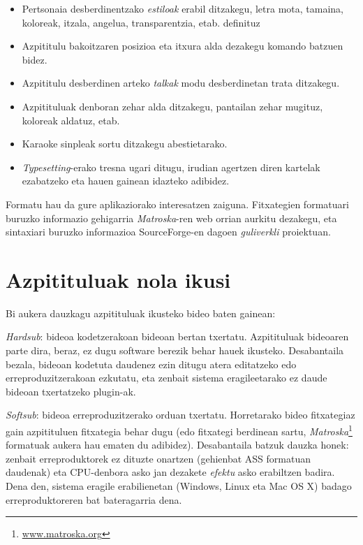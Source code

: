 \begin{itemize}
\item Pertsonaia desberdinentzako \textit{estiloak} erabil ditzakegu, letra mota, tamaina, koloreak, itzala, angelua, transparentzia, etab. definituz
\item Azpititulu bakoitzaren posizioa eta itxura alda dezakegu komando batzuen bidez.
\item Azpititulu desberdinen arteko \textit{talkak} modu desberdinetan trata ditzakegu.
\item Azpitituluak denboran zehar alda ditzakegu, pantailan zehar mugituz, koloreak aldatuz, etab.
\item Karaoke sinpleak sortu ditzakegu abestietarako.
\item \textit{Typesetting}-erako tresna ugari ditugu, irudian agertzen diren kartelak ezabatzeko eta hauen gainean idazteko adibidez.
\end{itemize}

Formatu hau da gure aplikaziorako interesatzen zaiguna. Fitxategien formatuari buruzko informazio gehigarria \textit{Matroska}-ren web orrian\cite{ma:ass} aurkitu dezakegu, eta sintaxiari buruzko informazioa SourceForge-en dagoen \textit{guliverkli} proiektuan\cite{gu:ass}.

\section{Azpitituluak nola ikusi}
Bi aukera dauzkagu azpitituluak ikusteko bideo baten gainean:

\textit{Hardsub}: bideoa kodetzerakoan bideoan bertan txertatu. Azpitituluak bideoaren parte dira, beraz, ez dugu software berezik behar hauek ikusteko. Desabantaila bezala, bideoan kodetuta daudenez ezin ditugu atera editatzeko edo erreproduzitzerakoan ezkutatu, eta zenbait sistema eragileetarako ez daude bideoan txertatzeko plugin-ak.

\textit{Softsub}: bideoa erreproduzitzerako orduan txertatu. Horretarako bideo fitxategiaz gain azpitituluen fitxategia behar dugu (edo fitxategi berdinean sartu, \textit{Matroska}\footnote{\url{www.matroska.org}} formatuak aukera hau ematen du adibidez). Desabantaila batzuk dauzka honek: zenbait erreproduktorek ez dituzte onartzen (gehienbat ASS formatuan daudenak) eta CPU-denbora asko jan dezakete \textit{efektu} asko erabiltzen badira. Dena den, sistema eragile erabilienetan (Windows, Linux eta Mac OS X) badago erreproduktoreren bat bateragarria dena.

